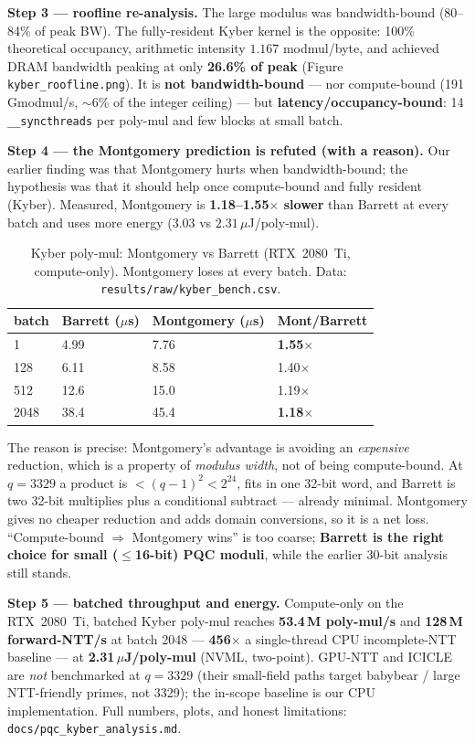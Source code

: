\documentclass[11pt,a4paper]{article}
\begin{document}
\textbf{Step 3 --- roofline re-analysis.} The large modulus was bandwidth-bound (80--84\% of peak BW).
The fully-resident Kyber kernel is the opposite: 100\% theoretical occupancy, arithmetic intensity
$1.167$ modmul/byte, and achieved DRAM bandwidth peaking at only \textbf{26.6\% of peak} (Figure
\texttt{kyber\_roofline.png}). It is \textbf{not bandwidth-bound} --- nor compute-bound (191 Gmodmul/s,
$\sim$6\% of the integer ceiling) --- but \textbf{latency/occupancy-bound}: 14 \verb|__syncthreads| per
poly-mul and few blocks at small batch.

\textbf{Step 4 --- the Montgomery prediction is refuted (with a reason).} Our earlier finding was that
Montgomery hurts when bandwidth-bound; the hypothesis was that it should help once compute-bound and
fully resident (Kyber). Measured, Montgomery is \textbf{1.18--1.55$\times$ slower} than Barrett at
every batch and uses more energy ($3.03$ vs $2.31\,\mu$J/poly-mul).

\begin{table}[h]
\centering
\caption{Kyber poly-mul: Montgomery vs Barrett (RTX~2080~Ti, compute-only). Montgomery loses at every
batch. Data: \texttt{results/raw/kyber\_bench.csv}.}
\begin{tabular}{R{1.6cm}R{2.0cm}R{2.2cm}R{2.4cm}}
\toprule
batch & Barrett ($\mu$s) & Montgomery ($\mu$s) & Mont/Barrett \\
    & 4.99  & 7.76  & \textbf{1.55$\times$} \\
128  & 6.11  & 8.58  & 1.40$\times$ \\
512  & 12.6  & 15.0  & 1.19$\times$ \\
2048 & 38.4  & 45.4  & \textbf{1.18$\times$} \\
\bottomrule
\end{tabular}
\end{table}

The reason is precise: Montgomery's advantage is avoiding an \emph{expensive} reduction, which is a
property of \emph{modulus width}, not of being compute-bound. At $q=3329$ a product is
$<(q-1)^2<2^{24}$, fits in one 32-bit word, and Barrett is two 32-bit multiplies plus a conditional
subtract --- already minimal. Montgomery gives no cheaper reduction and adds domain conversions, so it
is a net loss. ``Compute-bound $\Rightarrow$ Montgomery wins'' is too coarse; \textbf{Barrett is the
right choice for small ($\le$16-bit) PQC moduli}, while the earlier 30-bit analysis still stands.

\textbf{Step 5 --- batched throughput and energy.} Compute-only on the RTX~2080~Ti, batched Kyber
poly-mul reaches \textbf{53.4\,M poly-mul/s} and \textbf{128\,M forward-NTT/s} at batch 2048 ---
\textbf{456$\times$} a single-thread CPU incomplete-NTT baseline --- at \textbf{2.31\,$\mu$J/poly-mul}
(NVML, two-point). GPU-NTT and ICICLE are \emph{not} benchmarked at $q=3329$ (their small-field paths
target babybear / large NTT-friendly primes, not 3329); the in-scope baseline is our CPU
implementation. Full numbers, plots, and honest limitations: \texttt{docs/pqc\_kyber\_analysis.md}.
\end{document}
